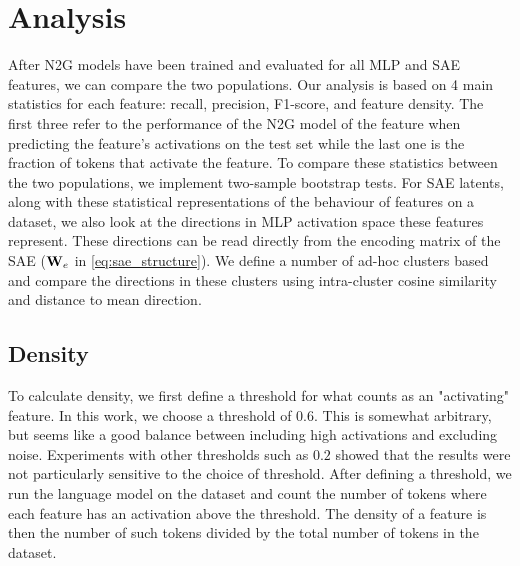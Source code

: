 \section{Analysis}
After N2G models have been trained and evaluated for all MLP and SAE features, we can compare the two populations.
Our analysis is based on 4 main statistics for each feature: recall, precision, F1-score, and feature density.
The first three refer to the performance of the N2G model of the feature when predicting the feature's activations on the test set while the last one is the fraction of tokens that activate the feature.
To compare these statistics between the two populations, we implement two-sample bootstrap tests.
For SAE latents, along with these statistical representations of the behaviour of features on a dataset, we also look at the directions in MLP activation space these features represent.
These directions can be read directly from the encoding matrix of the SAE ($\mathbf{W}_e$ in \autoref{eq:sae_structure}).
We define a number of ad-hoc clusters based and compare the directions in these clusters using intra-cluster cosine similarity and distance to mean direction.

\subsection{Density}
\label{sec:density}
To calculate density, we first define a threshold for what counts as an "activating" feature.
In this work, we choose a threshold of $0.6$.
This is somewhat arbitrary, but seems like a good balance between including high activations and excluding noise.
Experiments with other thresholds such as $0.2$ showed that the results were not particularly sensitive to the choice of threshold.
After defining a threshold, we run the language model on the dataset and count the number of tokens where each feature has an activation above the threshold.
The density of a feature is then the number of such tokens divided by the total number of tokens in the dataset.
